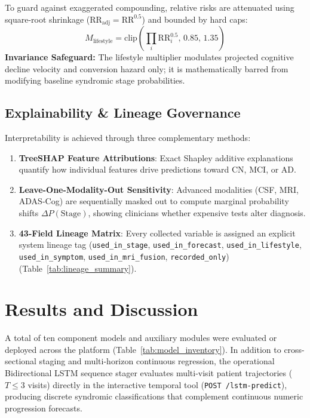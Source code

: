\documentclass[11pt,a4paper]{article}
\begin{document}
To guard against exaggerated compounding, relative risks are attenuated using square-root shrinkage ($\text{RR}_{\text{adj}} = \text{RR}^{0.5}$) and bounded by hard caps:
\begin{equation}
    M_{\text{lifestyle}} = \text{clip}\left(\prod_{i} \text{RR}_{i}^{0.5}, \, 0.85, \, 1.35\right)
\end{equation}
\textbf{Invariance Safeguard:} The lifestyle multiplier modulates projected cognitive decline velocity and conversion hazard only; it is mathematically barred from modifying baseline syndromic stage probabilities.

\subsection{Explainability & Lineage Governance}
Interpretability is achieved through three complementary methods:
\begin{enumerate}
    \item \textbf{TreeSHAP Feature Attributions}: Exact Shapley additive explanations~\cite{lundberg2017shap} quantify how individual features drive predictions toward CN, MCI, or AD.
    \item \textbf{Leave-One-Modality-Out Sensitivity}: Advanced modalities (CSF, MRI, ADAS-Cog) are sequentially masked out to compute marginal probability shifts $\Delta P(\text{Stage})$, showing clinicians whether expensive tests alter diagnosis.
    \item \textbf{43-Field Lineage Matrix}: Every collected variable is assigned an explicit system lineage tag (\texttt{used\_in\_stage}, \texttt{used\_in\_forecast}, \texttt{used\_in\_lifestyle}, \texttt{used\_in\_symptom}, \texttt{used\_in\_mri\_fusion}, \texttt{recorded\_only}) (Table~\ref{tab:lineage_summary}).
\end{enumerate}


\section{Results and Discussion}
\label{sec:results}

A total of ten component models and auxiliary modules were evaluated or deployed across the platform (Table~\ref{tab:model_inventory}). In addition to cross-sectional staging and multi-horizon continuous regression, the operational Bidirectional LSTM sequence stager evaluates multi-visit patient trajectories ($T \le 3$ visits) directly in the interactive temporal tool (\texttt{POST /lstm-predict}), producing discrete syndromic classifications that complement continuous numeric progression forecasts.
\end{document}
